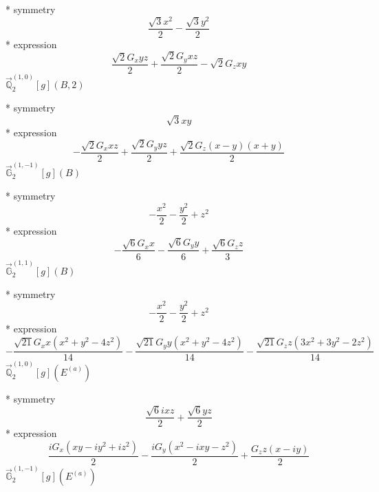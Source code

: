 \documentclass[fleqn,8pt]{jsarticle}
\begin{document}
\noindent\quad ** symmetry
\begin{dmath*}
\frac{\sqrt{3} x^{2}}{2} - \frac{\sqrt{3} y^{2}}{2}
\end{dmath*}
\noindent\quad ** expression
\begin{dmath*}
\frac{\sqrt{2} G_{x} y z}{2} + \frac{\sqrt{2} G_{y} x z}{2} - \sqrt{2} G_{z} x y
\end{dmath*}
\noindent\quad $\vec{\mathbb{Q}}_{2}^{(1,0)}[g](B,2)$

\noindent\quad ** symmetry
\begin{dmath*}
\sqrt{3} x y
\end{dmath*}
\noindent\quad ** expression
\begin{dmath*}
- \frac{\sqrt{2} G_{x} x z}{2} + \frac{\sqrt{2} G_{y} y z}{2} + \frac{\sqrt{2} G_{z} \left(x - y\right) \left(x + y\right)}{2}
\end{dmath*}
\noindent\quad $\vec{\mathbb{G}}_{2}^{(1,-1)}[g](B)$

\noindent\quad ** symmetry
\begin{dmath*}
- \frac{x^{2}}{2} - \frac{y^{2}}{2} + z^{2}
\end{dmath*}
\noindent\quad ** expression
\begin{dmath*}
- \frac{\sqrt{6} G_{x} x}{6} - \frac{\sqrt{6} G_{y} y}{6} + \frac{\sqrt{6} G_{z} z}{3}
\end{dmath*}
\noindent\quad $\vec{\mathbb{G}}_{2}^{(1,1)}[g](B)$

\noindent\quad ** symmetry
\begin{dmath*}
- \frac{x^{2}}{2} - \frac{y^{2}}{2} + z^{2}
\end{dmath*}
\noindent\quad ** expression
\begin{dmath*}
- \frac{\sqrt{21} G_{x} x \left(x^{2} + y^{2} - 4 z^{2}\right)}{14} - \frac{\sqrt{21} G_{y} y \left(x^{2} + y^{2} - 4 z^{2}\right)}{14} - \frac{\sqrt{21} G_{z} z \left(3 x^{2} + 3 y^{2} - 2 z^{2}\right)}{14}
\end{dmath*}
\noindent\quad $\vec{\mathbb{Q}}_{2}^{(1,0)}[g](E^{(a)})$

\noindent\quad ** symmetry
\begin{dmath*}
\frac{\sqrt{6} i x z}{2} + \frac{\sqrt{6} y z}{2}
\end{dmath*}
\noindent\quad ** expression
\begin{dmath*}
\frac{i G_{x} \left(x y - i y^{2} + i z^{2}\right)}{2} - \frac{i G_{y} \left(x^{2} - i x y - z^{2}\right)}{2} + \frac{G_{z} z \left(x - i y\right)}{2}
\end{dmath*}
\noindent\quad $\vec{\mathbb{G}}_{2}^{(1,-1)}[g](E^{(a)})$
\end{document}
